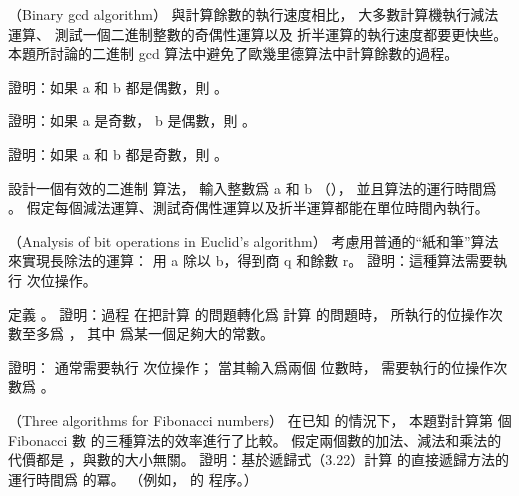 \startsubject[
  title={Problems},
]

\startPROBLEM
（Binary gcd algorithm）
與計算餘數的執行速度相比，
大多數計算機執行減法運算、
測試一個二進制整數的奇偶性運算以及
折半運算的執行速度都要更快些。
本題所討論的{\EMP 二進制 gcd 算法}中避免了歐幾里德算法中計算餘數的過程。

\startigBase[a]\startitem
證明：如果 a 和 b 都是偶數，則 。
\stopitem\stopigBase

\startANSWER
{}
\stopANSWER

\startigBase[continue]\startitem
證明：如果 a 是奇數， b 是偶數，則 。
\stopitem\stopigBase

\startANSWER
{}
\stopANSWER

\startigBase[continue]\startitem
證明：如果 a 和 b 都是奇數，則 。
\stopitem\stopigBase

\startANSWER
{}
\stopANSWER

\startigBase[continue]\startitem
設計一個有效的二進制 \m{\gcd} 算法，
輸入整數爲 a 和 b （），
並且算法的運行時間爲 。
假定每個減法運算、測試奇偶性運算以及折半運算都能在單位時間內執行。
\stopitem\stopigBase

\startANSWER
{}
\stopANSWER
\stopPROBLEM

\startPROBLEM
（Analysis of bit operations in Euclid’s algorithm）
\startigBase[a]\startitem
考慮用普通的“紙和筆”算法來實現長除法的運算：
用 a 除以 b，得到商 q 和餘數 r。
證明：這種算法需要執行  次位操作。
\stopitem\stopigBase

\startANSWER
{}
\stopANSWER

\startigBase[continue]\startitem
定義 。
證明：過程  在把計算  的問題轉化爲
計算  的問題時，
所執行的位操作次數至多爲 ，
其中  爲某一個足夠大的常數。
\stopitem\stopigBase

\startANSWER
{}
\stopANSWER

\startigBase[continue]\startitem
證明：  通常需要執行  次位操作；
當其輸入爲兩個 \m{\beta} 位數時，
需要執行的位操作次數爲 。
\stopitem\stopigBase

\startANSWER
{}
\stopANSWER
\stopPROBLEM

\startPROBLEM
（Three algorithms for Fibonacci numbers）
在已知  的情況下，
本題對計算第  個 Fibonacci 數  的三種算法的效率進行了比較。
假定兩個數的加法、減法和乘法的代價都是 ，與數的大小無關。
\startigBase[a]\startitem
證明：基於遞歸式（3.22）計算  的直接遞歸方法的運行時間爲  的冪。
（例如， 的  程序。）
\stopitem\stopigBase

